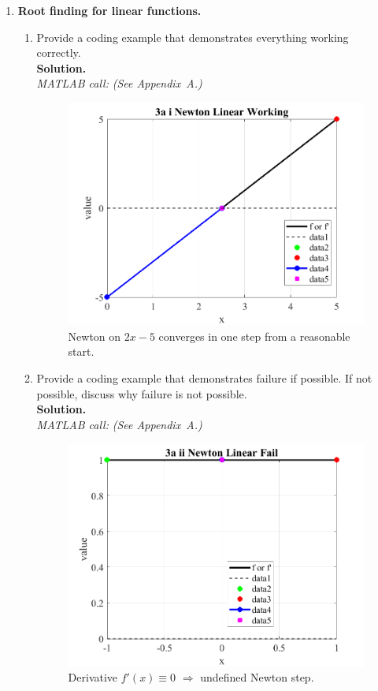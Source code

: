 \documentclass[11pt]{article}
\begin{document}
	\begin{enumerate}[label=3(\alph*)]
		
		\item \textbf{Root finding for linear functions.}
		\begin{enumerate}[label=\roman*)]
			
			\item Provide a coding example that demonstrates everything working correctly.\\
			\textbf{Solution.}\\
			\textit{MATLAB call:} \emph{(See Appendix~A.)}
			
			\begin{figure}[H]\centering
				\includegraphics[width=0.78\linewidth]{plots/3a_i_Newton_Linear_Working.png}
				\caption{Newton on \(2x-5\) converges in one step from a reasonable start.}
			\end{figure}
			
			\item Provide a coding example that demonstrates failure if possible. If not possible, discuss why failure is not possible.\\
			\textbf{Solution.}\\
			\textit{MATLAB call:} \emph{(See Appendix~A.)}
			
			\begin{figure}[H]\centering
				\includegraphics[width=0.78\linewidth]{plots/3a_ii_Newton_Linear_Fail.png}
				\caption{Derivative \(f'(x)\equiv 0\) \(\Rightarrow\) undefined Newton step.}
			\end{figure}
			

\end{enumerate}
\end{enumerate}
\end{document}
